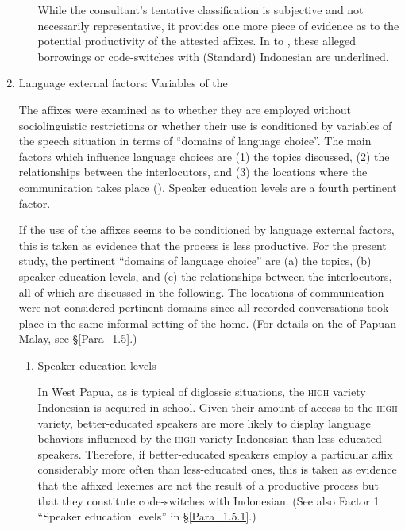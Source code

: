 \begin{enumerate}
\begin{enumerate}
While the consultant’s tentative classification is subjective and not necessarily representative, it provides one more piece of evidence as to the potential productivity of the attested affixes. In  to , these alleged borrowings or code-switches with (Standard) Indonesian are underlined.


\end{enumerate}
\item 
{Language external factors\label{List_3.2}}: Variables of the 


The affixes were examined as to whether they are employed without sociolinguistic restrictions or whether their use is conditioned by variables of the speech situation in terms of  “domains of language choice”. The main factors which influence language choices are (1) the topics discussed, (2) the relationships between the interlocutors, and (3) the locations where the communication takes place (\citeyear*[67, 75]{Fishman.1965}). Speaker education levels are a fourth pertinent factor.



If the use of the affixes seems to be conditioned by language external factors, this is taken as evidence that the  process is less productive. For the present study, the pertinent “domains of language choice” are (a) the topics, (b) speaker education levels, and (c) the relationships between the interlocutors, all of which are discussed in the following. The locations of communication were not considered pertinent domains since all recorded conversations took place in the same informal setting of the home. (For details on the  of Papuan Malay, see §\ref{Para_1.5}.)


\begin{enumerate}
\item 
Speaker education levels\label{List_3.2.a}


In West Papua, as is typical of diglossic situations, the \textsc{high} variety Indonesian is acquired in school. Given their amount of access to the \textsc{high} variety, better-educated speakers are more likely to display language behaviors influenced by the \textsc{high} variety Indonesian than less-educated speakers. Therefore, if better-educated speakers employ a particular affix considerably more often than less-educated ones, this is taken as evidence that the affixed lexemes are not the result of a productive process but that they constitute code-switches with Indonesian. (See also Factor 1 ``Speaker education levels'' in §\ref{Para_1.5.1}.)




\end{enumerate}
\end{enumerate}
